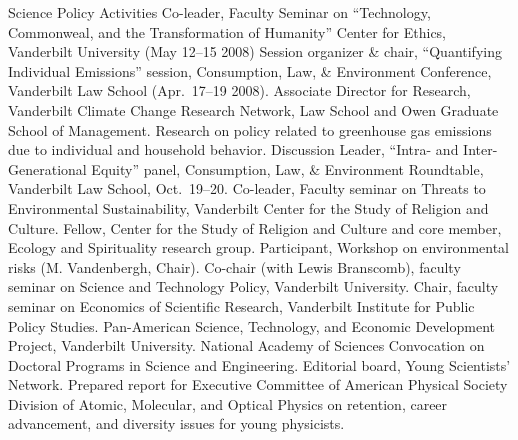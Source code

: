 \begin{rubric}{Science Policy Activities}%
\entry*[2008]Co-leader, Faculty Seminar on ``Technology, Commonweal, and the Transformation of Humanity'' Center for Ethics, Vanderbilt University (May 12--15 2008)
\entry*[2008]Session organizer \& chair, ``Quantifying Individual Emissions'' session, Consumption, Law, \& Environment Conference, Vanderbilt Law School (Apr.~17--19 2008).
\entry*[2007--]Associate Director for Research, Vanderbilt Climate Change Research Network, Law School and Owen Graduate School of Management. Research on policy related to greenhouse gas emissions due to individual and household behavior.
\entry*[2006]Discussion Leader, ``Intra- and Inter-Generational Equity'' panel, Consumption, Law, \& Environment Roundtable, Vanderbilt Law School, Oct.~19--20.
\entry*[2005]Co-leader, Faculty seminar on Threats to Environmental Sustainability, Vanderbilt Center for the Study of Religion and Culture.
\entry*[2004--]Fellow, Center for the Study of Religion and Culture and core member, Ecology and Spirituality research group.
\entry*[2003]Participant, Workshop on environmental risks (M. Vandenbergh, Chair).
\entry*[1999--2000]Co-chair (with Lewis Branscomb), faculty seminar on Science and Technology Policy, Vanderbilt University.
\entry*[1996--1997]Chair, faculty seminar on Economics of Scientific Research, Vanderbilt Institute for Public Policy Studies.
\entry*[1996]Pan-American Science, Technology, and Economic Development Project, Vanderbilt University.
\entry*[1996]National Academy of Sciences Convocation on Doctoral Programs in Science and Engineering.
\entry*[1991--1995]Editorial board, Young Scientists' Network.
\entry*[1993]Prepared report for Executive Committee of American Physical Society Division of Atomic, Molecular, and Optical Physics on retention, career advancement, and diversity issues for young physicists.
\end{rubric}
